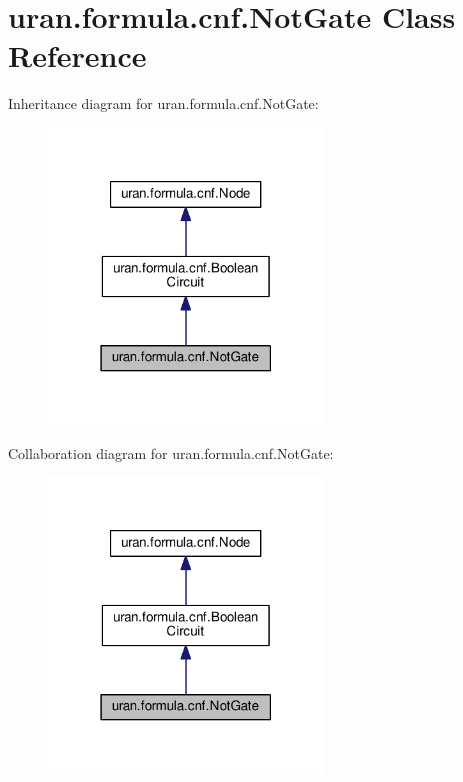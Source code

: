 \hypertarget{classuran_1_1formula_1_1cnf_1_1_not_gate}{}\section{uran.\+formula.\+cnf.\+Not\+Gate Class Reference}
\label{classuran_1_1formula_1_1cnf_1_1_not_gate}


Inheritance diagram for uran.\+formula.\+cnf.\+Not\+Gate\+:
\nopagebreak
\begin{figure}[H]
\begin{center}
\leavevmode
\includegraphics[width=207pt]{classuran_1_1formula_1_1cnf_1_1_not_gate__inherit__graph}
\end{center}
\end{figure}


Collaboration diagram for uran.\+formula.\+cnf.\+Not\+Gate\+:
\nopagebreak
\begin{figure}[H]
\begin{center}
\leavevmode
\includegraphics[width=207pt]{classuran_1_1formula_1_1cnf_1_1_not_gate__coll__graph}
\end{center}
\end{figure}
